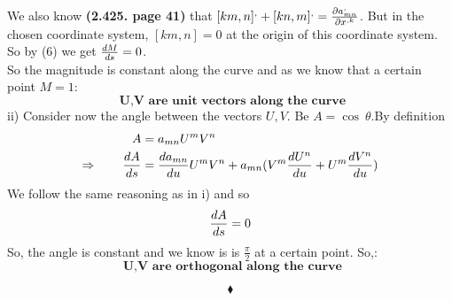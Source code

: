 We also know \textbf{(2.425. page 41)} that $[km,n]^, + [kn,m]^, = \pdv{a^,_{mn}}{x^{,k}}$. But in the chosen coordinate system, $[km,n] = 0$ at the origin of this coordinate system. So by (6) we get $\dv{M}{s} = 0$.\\
So the magnitude is constant along the curve and as we know that a certain point $M =1$:\\
$$\textbf{ U,V are unit vectors along the curve}$$\newpage
ii) Consider now the angle between the vectors $U,V$. Be $A = \cos \ \theta$.By definition 
\begin{align}
\ A &= a_{mn}U ^mV^n\\
\Rightarrow \quad\quad \dv{A}{s} &= \dv{a_{mn}}{u}U^m V^n + a_{mn}(V^m \dv{U^n}{u} +U^m \dv{V^n}{u} )
\end{align}
We follow the same reasoning as in i) and so
$$\dv{A}{s} = 0$$
So, the angle is constant and we know is is $\frac{\pi}{2}$ at a certain point. So,:
$$\textbf{ U,V are orthogonal along the curve}$$

$$\blacklozenge$$
\newpage

